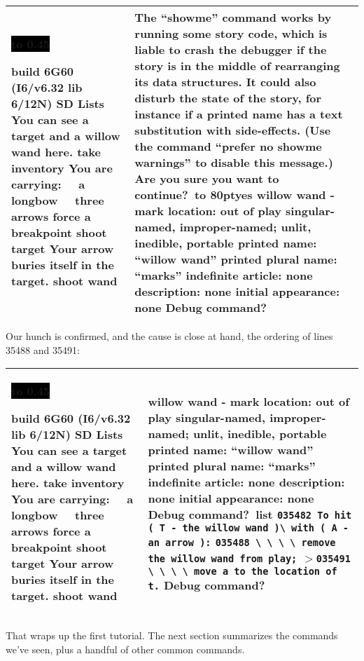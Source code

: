 \documentclass{book}
\newcommand{\n}{\hspace*{\fill}\newline}
\newcommand{\terp}[2]{\begin{center}\begin{tabular}{p{0.45\textwidth}|p{0.45\textwidth}}\midrule #1&#2\\\midrule\end{tabular}\end{center}}
\newcommand{\glkheading}[1]{\textbf{#1}}
\newcommand{\glkinput}[1]{\textbf{#1}}
\newcommand{\glkstatusline}[2]{\centerline{\colorbox{black}{\hbox to 0.45\textwidth{\textcolor{white}{#1\hfil #2}}}}}
\newcommand{\storyprompt}{\raisebox{1.5pt}{\(>\)}}
\newcommand{\cursor}{\raisebox{-1.5pt}{\RectangleThin}}
\newcommand{\markedindent}{\(>\)\qquad}
\newcommand{\unmarkedindent}{\hphantom{\(>\)}\qquad}
\begin{document}
\terp{\glkstatusline{Lists}{0/3}\n
  build 6G60 (I6/v6.32 lib 6/12N) SD\n
  \n
  \glkheading{Lists}\n
  You can see a target and a willow wand here.\n
  \n
  \storyprompt\glkinput{take inventory}\n
  You are carrying:\n
  \null\ \ a longbow\n
  \null\ \ three arrows\n
  \n
  \storyprompt\glkinput{force a breakpoint}\n
  \storyprompt\glkinput{shoot target}\n
  Your arrow buries itself in the target.\n
  \n
  \storyprompt\glkinput{shoot wand}\n
  \n
  [** Programming error: tried to ``move'' arrow to nothing **]}{%
  The ``showme'' command works by running some story code, which is liable to crash the debugger if the story is in the middle of rearranging its data structures.  It could also disturb the state of the story, for instance if a printed name has a text substitution with side-effects.  (Use the command ``prefer no showme warnings'' to disable this message.)  Are you sure you want to continue?\ \hbox to 80pt{\glkinput{yes}\hfil}\n
  \n
  willow wand - mark\n
  location: out of play\n
  singular-named, improper-named; unlit, inedible, portable\n
  printed name: ``willow wand''\n
  printed plural name: ``marks''\n
  indefinite article: none\n
  description: none\n
  initial appearance: none\n
  \n
  Debug command?\ \cursor}

Our hunch is confirmed, and the cause is close at hand, the ordering of lines
35488 and 35491:

\terp{\glkstatusline{Lists}{0/3}\n
  build 6G60 (I6/v6.32 lib 6/12N) SD\n
  \n
  \glkheading{Lists}\n
  You can see a target and a willow wand here.\n
  \n
  \storyprompt\glkinput{take inventory}\n
  You are carrying:\n
  \null\ \ a longbow\n
  \null\ \ three arrows\n
  \n
  \storyprompt\glkinput{force a breakpoint}\n
  \storyprompt\glkinput{shoot target}\n
  Your arrow buries itself in the target.\n
  \n
  \storyprompt\glkinput{shoot wand}\n
  \n
  [** Programming error: tried to ``move'' arrow to nothing **]}{%
  \n
  willow wand - mark\n
  location: out of play\n
  singular-named, improper-named; unlit, inedible, portable\n
  printed name: ``willow wand''\n
  printed plural name: ``marks''\n
  indefinite article: none\n
  description: none\n
  initial appearance: none\n
  \n
  Debug command?\ \glkinput{list}\n
  \n
  \unmarkedindent \lstinline{035482 To hit ( T - the willow wand )}\lstinline{\ with ( A - an arrow ):}\n
  \unmarkedindent \lstinline{035488 \ \ \ \ remove the willow wand from play;}\n
  \markedindent \lstinline{035491 \ \ \ \ move a to the location of t.}\n
  \n
  Debug command?\ \cursor}

That wraps up the first tutorial.  The next section summarizes the commands
we've seen, plus a handful of other common commands.
\end{document}

